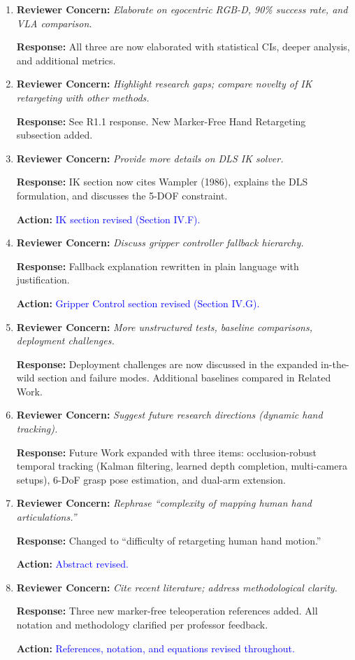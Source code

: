 \documentclass[11pt]{article}
\newcommand{\concern}[1]{\textbf{Reviewer Concern:} \textit{#1}}
\newcommand{\response}[1]{\textbf{Response:} #1}
\newcommand{\action}[1]{\textbf{Action:} \textcolor{blue}{#1}}
\begin{document}
\begin{enumerate}[label=\textbf{R4.\arabic*--14}]

\item[R4.1--3] \concern{Elaborate on egocentric RGB-D, 90\% success rate, and VLA comparison.}

\response{All three are now elaborated with statistical CIs, deeper analysis, and additional metrics.}

\item[R4.4--5] \concern{Highlight research gaps; compare novelty of IK retargeting with other methods.}

\response{See R1.1 response. New Marker-Free Hand Retargeting subsection added.}

\item[R4.6] \concern{Provide more details on DLS IK solver.}

\response{IK section now cites Wampler (1986), explains the DLS formulation, and discusses the 5-DOF constraint.}

\action{IK section revised (Section IV.F).}

\item[R4.7] \concern{Discuss gripper controller fallback hierarchy.}

\response{Fallback explanation rewritten in plain language with justification.}

\action{Gripper Control section revised (Section IV.G).}

\item[R4.8--10] \concern{More unstructured tests, baseline comparisons, deployment challenges.}

\response{Deployment challenges are now discussed in the expanded in-the-wild section and failure modes. Additional baselines compared in Related Work.}

\item[R4.11] \concern{Suggest future research directions (dynamic hand tracking).}

\response{Future Work expanded with three items: occlusion-robust temporal tracking (Kalman filtering, learned depth completion, multi-camera setups), 6-DoF grasp pose estimation, and dual-arm extension.}

\item[R4.12] \concern{Rephrase ``complexity of mapping human hand articulations.''}

\response{Changed to ``difficulty of retargeting human hand motion.''}

\action{Abstract revised.}

\item[R4.13--14] \concern{Cite recent literature; address methodological clarity.}

\response{Three new marker-free teleoperation references added. All notation and methodology clarified per professor feedback.}

\action{References, notation, and equations revised throughout.}

\end{enumerate}
\end{document}
